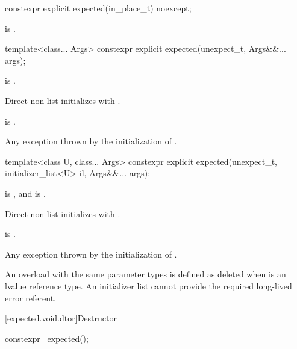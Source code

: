 %
\begin{itemdecl}
constexpr explicit expected(in_place_t) noexcept;
\end{itemdecl}

\begin{itemdescr}
\pnum
\ensures
{} is .
\end{itemdescr}

%
\begin{itemdecl}
template<class... Args>
  constexpr explicit expected(unexpect_t, Args&&... args);
\end{itemdecl}

\begin{itemdescr}
\pnum
\constraints
{} is .

\pnum
\effects
Direct-non-list-initializes 
with .

\pnum
\ensures
{} is .

\pnum
\throws
Any exception thrown by the initialization of .
\end{itemdescr}

%
\begin{itemdecl}
template<class U, class... Args>
  constexpr explicit expected(unexpect_t, initializer_list<U> il, Args&&... args);
\end{itemdecl}

\begin{itemdescr}
\pnum
\constraints
{} is , and
 is .

\pnum
\effects
Direct-non-list-initializes 
with .

\pnum
\ensures
{} is .

\pnum
\throws
Any exception thrown by the initialization of .

\pnum
\remarks
An overload with the same parameter types is defined as deleted when 
is an lvalue reference type. An initializer list cannot provide the required
long-lived error referent.
\end{itemdescr}

[expected.void.dtor]{Destructor}

%
\begin{itemdecl}
constexpr ~expected();
\end{itemdecl}

